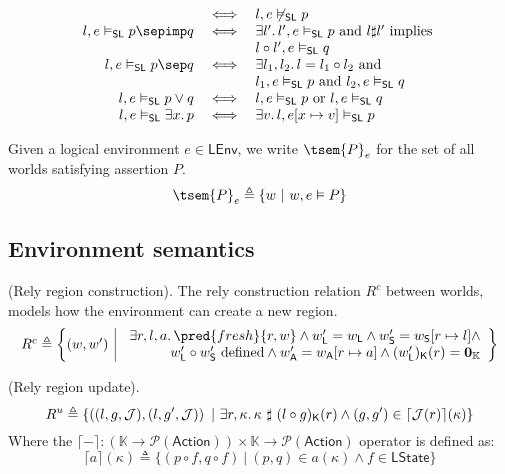 \[\begin{array}{r c l}
	&
	\iff
	&
	l, e \not\vDash_\mathsf{SL} p
\\
	l, e \vDash_\mathsf{SL} p \sepimp q
	&
	\iff
	&
	\exists l' \ldotp l', e \vDash_\mathsf{SL} p \text{ and } l \sharp l' \text{ implies } \\
	&& l \circ l', e \vDash_\mathsf{SL} q
\\
	l, e \vDash_\mathsf{SL} p \sep q
	&
	\iff
	&
	\exists l_1, l_2 \ldotp l = l_1 \circ l_2 \text{ and } \\
	&& l_1, e \vDash_\mathsf{SL} p \text{ and } l_2, e \vDash_\mathsf{SL} q
\\
	 l, e \vDash_\mathsf{SL} p \lor q
	 &
	 \iff
	 &
	 l, e \vDash_\mathsf{SL} p \text{ or } l, e \vDash_\mathsf{SL} q
\\
	l, e \vDash_\mathsf{SL} \exists x \ldotp p
	&
	\iff
	&
	\exists v \ldotp l, e[x \mapsto v] \vDash_\mathsf{SL} p
\end{array}
\]
\endgroup

Given a logical environment $e \in \mathsf{LEnv}$, we write $\tsem{P}_e$ for the set of all worlds satisfying assertion $P$.
\[
	\tsem{P}_e \triangleq \{ w\ |\ w, e \vDash P \}
\]

\subsection{Environment semantics}

 (Rely region construction). The rely construction relation $R^c$ between worlds, models how the environment can create a new region.
\[
\begin{array}{r | l}
	R^c \triangleq \bigg\{ (w, w')
	&
	\begin{array}{r}
		\exists r, l, a \ldotp \pred{fresh}{r, w} \land w'_\mathsf{L} = w_\mathsf{L} \land w'_\mathsf{S} = w_\mathsf{S}[r \mapsto l] \land
		\\
		w'_\mathsf{L} \circ w'_\mathsf{S} \text{ defined} \land w'_\mathsf{A} = w_\mathsf{A}[r \mapsto a] \land (w'_\mathsf{L})_\mathsf{K}(r) = \mathbf{0}_\mathbb{K}
	\end{array}
	\bigg\}
\end{array}
\]

 (Rely region update).
\[
	R^u \triangleq \{ \left( (l, g, \mathcal{J}), (l, g', \mathcal{J}) \right)\ |\ \exists r, \kappa \ldotp  \kappa\ \sharp\ (l \circ g)_\mathsf{K}(r) \land (g, g') \in \lceil \mathcal{J}(r) \rceil (\kappa) \}
\]
Where the $\lceil - \rceil : \left( \mathbb{K} \rightarrow \mathcal{P}(\mathsf{Action}) \right) \times \mathbb{K} \rightarrow \mathcal{P}(\mathsf{Action})$ operator is defined as:
\[
	\lceil a \rceil (\kappa) \triangleq \{ (p \circ f, q \circ f)\ |\ (p, q) \in a(\kappa) \land f \in \mathsf{LState} \}
\]

